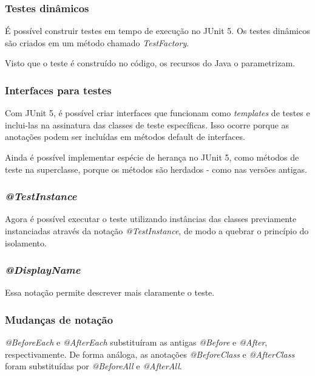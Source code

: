         \subsubsection{Testes dinâmicos}
        É possível construir testes em tempo de execução no JUnit 5. Os testes dinâmicos são criados em um método chamado \textit{TestFactory}.
        \par Visto que o teste é construído no código, os recursos do Java o parametrizam.
        \subsubsection{Interfaces para testes}
        Com JUnit 5, é possível criar interfaces que funcionam como \textit{templates} de testes e inclui-las na assinatura das classes de teste específicas. Isso ocorre porque as anotações podem ser incluídas em métodos default de interfaces.
        \newline
        \par Ainda é possível implementar espécie de herança no JUnit 5, como métodos de teste na superclasse, porque os métodos são herdados - como nas versões antigas.
        \subsubsection{\textit{@TestInstance}}
        Agora é possível executar o teste utilizando instâncias das classes previamente instanciadas através da notação \textit{@TestInstance}, de modo a quebrar o princípio do isolamento.
        \subsubsection{\textit{@DisplayName}}
        Essa notação permite descrever mais claramente o teste.
        \subsubsection{Mudanças de notação}
        \textit{@BeforeEach} e \textit{@AfterEach} substituíram as antigas \textit{@Before} e \textit{@After}, respectivamente.
        De forma análoga, as anotações \textit{@BeforeClass} e \textit{@AfterClass} foram substituídas por \textit{@BeforeAll} e \textit{@AfterAll}.
